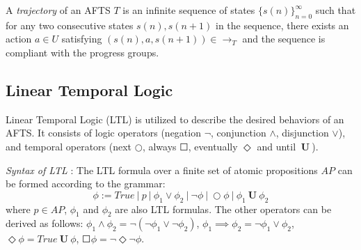 A \emph{trajectory} of an AFTS $T$ is an infinite sequence of states $\{s(n)\}_{n=0}^{\infty}$
such that for any two consecutive states $s(n), s(n+1)$ in the sequence, there exists an action $a\in U$ satisfying $(s(n),a,s(n+1))\in \rightarrow_T$ and the sequence is compliant with the progress groups. 

\subsection{Linear Temporal Logic}

Linear Temporal Logic (LTL) is utilized to describe the desired behaviors of an AFTS. It consists of logic operators (negation $ \neg $, conjunction $ \wedge $, disjunction $ \vee $), and temporal operators (next $ \bigcirc $, always $ \Square $, eventually $ \Diamond $ and until $ \mathbf{\ U\ }$).


{\color{black}\emph{ Syntax of LTL} \cite{baier2008principles}: The LTL formula over a finite set of atomic propositions $ AP $ can be formed according to the grammar:}
\begin{displaymath}
\phi := True\ \vert\ p\ \vert\ \phi_1 \vee \phi_2\ \vert\ \neg \phi\ \vert\ \bigcirc \phi\ \vert\ \phi_1 \mathbf{\ U\ }\phi_2
\end{displaymath}
where $ p\in AP $, $ \phi_1 $ and $ \phi_2 $ are also LTL formulas. The other operators can be derived as follows: $ \phi_1 \wedge \phi_2 = \neg (\neg \phi_1 \vee \neg \phi_2) $, $ \phi_1 \implies \phi_2 = \neg \phi_1 \vee \phi_2 $, $ \Diamond \phi = True \mathbf{\ U\ } \phi $, $ \Square \phi = \neg \Diamond \neg \phi $.

